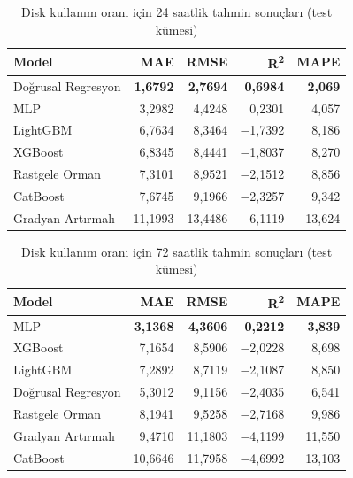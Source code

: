 \begin{table}[htbp]
    \centering
    \caption{Disk kullanım oranı için 24 saatlik tahmin sonuçları (test kümesi)}
    \label{tab:disk24}
    \begin{tabular}{lrrrr}
        \textbf{Model} & \textbf{MAE} & \textbf{RMSE} & \textbf{R\textsuperscript{2}} & \textbf{MAPE} \\
        \hline
        Doğrusal Regresyon  & \textbf{1,6792} & \textbf{2,7694} & \textbf{0,6984} & \textbf{2,069} \\
        MLP                 & 3,2982 & 4,4248 & 0,2301 & 4,057 \\
        LightGBM            & 6,7634 & 8,3464 & $-$1,7392 & 8,186 \\
        XGBoost             & 6,8345 & 8,4441 & $-$1,8037 & 8,270 \\
        Rastgele Orman      & 7,3101 & 8,9521 & $-$2,1512 & 8,856 \\
        CatBoost            & 7,6745 & 9,1966 & $-$2,3257 & 9,342 \\
        Gradyan Artırmalı   & 11,1993 & 13,4486 & $-$6,1119 & 13,624 \\
    \end{tabular}
\end{table}

\begin{table}[htbp]
    \centering
    \caption{Disk kullanım oranı için 72 saatlik tahmin sonuçları (test kümesi)}
    \label{tab:disk72}
    \begin{tabular}{lrrrr}
        \textbf{Model} & \textbf{MAE} & \textbf{RMSE} & \textbf{R\textsuperscript{2}} & \textbf{MAPE} \\
        \hline
        MLP                 & \textbf{3,1368} & \textbf{4,3606} & \textbf{0,2212} & \textbf{3,839} \\
        XGBoost             & 7,1654 & 8,5906 & $-$2,0228 & 8,698 \\
        LightGBM            & 7,2892 & 8,7119 & $-$2,1087 & 8,850 \\
        Doğrusal Regresyon  & 5,3012 & 9,1156 & $-$2,4035 & 6,541 \\
        Rastgele Orman      & 8,1941 & 9,5258 & $-$2,7168 & 9,986 \\
        Gradyan Artırmalı   & 9,4710 & 11,1803 & $-$4,1199 & 11,550 \\
        CatBoost            & 10,6646 & 11,7958 & $-$4,6992 & 13,103 \\
    \end{tabular}
\end{table}

